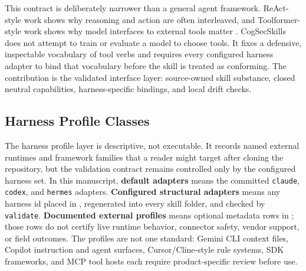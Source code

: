 \documentclass[
]{article}
\begin{document}
This contract is deliberately narrower than a general agent framework.
ReAct-style work shows why reasoning and action are often interleaved,
and Toolformer-style work shows why model interfaces to external tools
matter \citep{yao2022react, schick2023toolformer}. CogSecSkills does not
attempt to train or evaluate a model to choose tools. It fixes a
defensive, inspectable vocabulary of tool verbs and requires every
configured harness adapter to bind that vocabulary before the skill is
treated as conforming. The contribution is the validated interface
layer: source-owned skill substance, closed neutral capabilities,
harness-specific bindings, and local drift checks.

\subsection{Harness Profile Classes}\label{harness-profile-classes}

The harness profile layer is descriptive, not executable. It records
named external runtimes and framework families that a reader might
target after cloning the repository, but the validation contract remains
controlled only by the configured harness set. In this manuscript,
\textbf{default adapters} means the committed \texttt{claude},
\texttt{codex}, and \texttt{hermes} adapters. \textbf{Configured
structural adapters} means any harness id placed in
, regenerated into every skill folder, and
checked by \texttt{validate}. \textbf{Documented external profiles}
means optional metadata rows in
; those rows do not certify live
runtime behavior, connector safety, vendor support, or field outcomes.
The profiles are not one standard: Gemini CLI context files, Copilot
instruction and agent surfaces, Cursor/Cline-style rule systems, SDK
frameworks, and MCP tool hosts each require product-specific review
before use.
\end{document}
